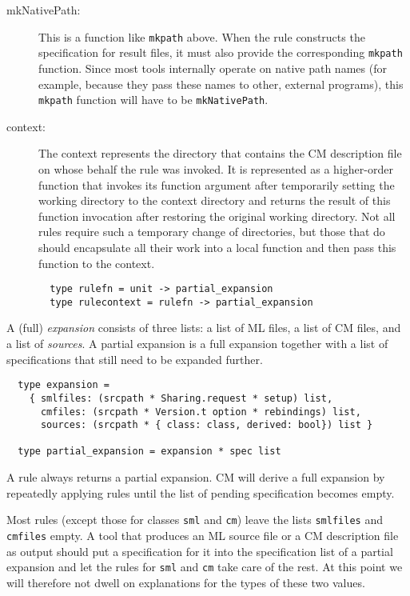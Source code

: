 \begin{description}
\item[mkNativePath:] This is a function like {\tt mkpath} above.  When
the rule constructs the specification for result files, it must also
provide the corresponding {\tt mkpath} function.  Since most tools
internally operate on native path names (for example, because they
pass these names to other, external programs), this {\tt mkpath}
function will have to be {\tt mkNativePath}.
\item[context:] The context represents the directory that contains the
CM description file on whose behalf the rule was invoked.  It is
represented as a higher-order function that invokes its function
argument after temporarily setting the working directory to the
context directory and returns the result of this function invocation
after restoring the original working directory.  Not all rules
require such a temporary change of directories, but those that do
should encapsulate all their work into a local function and then pass
this function to the context.
\begin{verbatim}
  type rulefn = unit -> partial_expansion
  type rulecontext = rulefn -> partial_expansion
\end{verbatim}
\end{description}

A (full) {\em expansion} consists of three lists: a list of ML files,
a list of CM files, and a list of {\em sources}.  A partial expansion
is a full expansion together with a list of specifications that still
need to be expanded further.

\begin{verbatim}
  type expansion =
    { smlfiles: (srcpath * Sharing.request * setup) list,
      cmfiles: (srcpath * Version.t option * rebindings) list,
      sources: (srcpath * { class: class, derived: bool}) list }

  type partial_expansion = expansion * spec list
\end{verbatim}

A rule always returns a partial expansion.  CM will derive a full
expansion by repeatedly applying rules until the list of pending
specification becomes empty.

Most rules (except those for classes {\tt sml} and {\tt cm}) leave the
lists {\tt smlfiles} and {\tt cmfiles} empty.  A tool that produces an
ML source file or a CM description file as output should put a
specification for it into the specification list of a partial
expansion and let the rules for {\tt sml} and {\tt cm} take care of
the rest.  At this point we will therefore not dwell on explanations
for the types of these two values.

